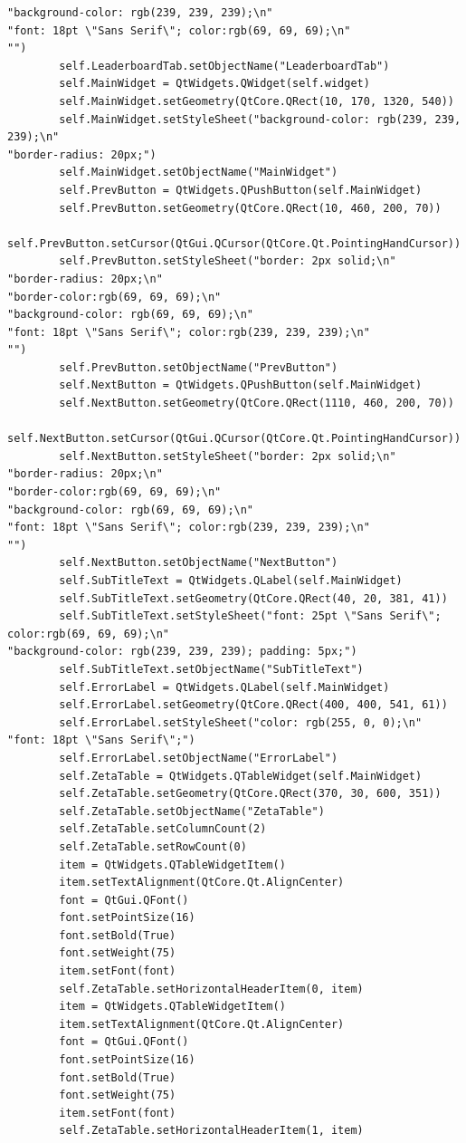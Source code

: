 \documentclass{article}
\begin{document}
\begin{lstlisting}
"background-color: rgb(239, 239, 239);\n"
"font: 18pt \"Sans Serif\"; color:rgb(69, 69, 69);\n"
"")
        self.LeaderboardTab.setObjectName("LeaderboardTab")
        self.MainWidget = QtWidgets.QWidget(self.widget)
        self.MainWidget.setGeometry(QtCore.QRect(10, 170, 1320, 540))
        self.MainWidget.setStyleSheet("background-color: rgb(239, 239, 239);\n"
"border-radius: 20px;")
        self.MainWidget.setObjectName("MainWidget")
        self.PrevButton = QtWidgets.QPushButton(self.MainWidget)
        self.PrevButton.setGeometry(QtCore.QRect(10, 460, 200, 70))
        self.PrevButton.setCursor(QtGui.QCursor(QtCore.Qt.PointingHandCursor))
        self.PrevButton.setStyleSheet("border: 2px solid;\n"
"border-radius: 20px;\n"
"border-color:rgb(69, 69, 69);\n"
"background-color: rgb(69, 69, 69);\n"
"font: 18pt \"Sans Serif\"; color:rgb(239, 239, 239);\n"
"")
        self.PrevButton.setObjectName("PrevButton")
        self.NextButton = QtWidgets.QPushButton(self.MainWidget)
        self.NextButton.setGeometry(QtCore.QRect(1110, 460, 200, 70))
        self.NextButton.setCursor(QtGui.QCursor(QtCore.Qt.PointingHandCursor))
        self.NextButton.setStyleSheet("border: 2px solid;\n"
"border-radius: 20px;\n"
"border-color:rgb(69, 69, 69);\n"
"background-color: rgb(69, 69, 69);\n"
"font: 18pt \"Sans Serif\"; color:rgb(239, 239, 239);\n"
"")
        self.NextButton.setObjectName("NextButton")
        self.SubTitleText = QtWidgets.QLabel(self.MainWidget)
        self.SubTitleText.setGeometry(QtCore.QRect(40, 20, 381, 41))
        self.SubTitleText.setStyleSheet("font: 25pt \"Sans Serif\"; color:rgb(69, 69, 69);\n"
"background-color: rgb(239, 239, 239); padding: 5px;")
        self.SubTitleText.setObjectName("SubTitleText")
        self.ErrorLabel = QtWidgets.QLabel(self.MainWidget)
        self.ErrorLabel.setGeometry(QtCore.QRect(400, 400, 541, 61))
        self.ErrorLabel.setStyleSheet("color: rgb(255, 0, 0);\n"
"font: 18pt \"Sans Serif\";")
        self.ErrorLabel.setObjectName("ErrorLabel")
        self.ZetaTable = QtWidgets.QTableWidget(self.MainWidget)
        self.ZetaTable.setGeometry(QtCore.QRect(370, 30, 600, 351))
        self.ZetaTable.setObjectName("ZetaTable")
        self.ZetaTable.setColumnCount(2)
        self.ZetaTable.setRowCount(0)
        item = QtWidgets.QTableWidgetItem()
        item.setTextAlignment(QtCore.Qt.AlignCenter)
        font = QtGui.QFont()
        font.setPointSize(16)
        font.setBold(True)
        font.setWeight(75)
        item.setFont(font)
        self.ZetaTable.setHorizontalHeaderItem(0, item)
        item = QtWidgets.QTableWidgetItem()
        item.setTextAlignment(QtCore.Qt.AlignCenter)
        font = QtGui.QFont()
        font.setPointSize(16)
        font.setBold(True)
        font.setWeight(75)
        item.setFont(font)
        self.ZetaTable.setHorizontalHeaderItem(1, item)


\end{lstlisting}
\end{document}
